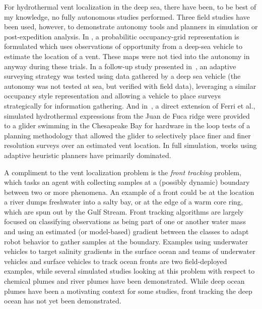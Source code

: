 For hydrothermal vent localization in the deep sea, there have been, to be best of my knowledge, no fully autonomous studies performed. Three field studies have been used, however, to demonstrate autonomy tools and planners in simulation or post-expedition analysis. In \cite{jakuba2007stochastic}, a probabilitic occupancy-grid representation is formulated which uses observations of opportunity from a deep-sea vehicle to estimate the location of a vent. These maps were not tied into the autonomy in anyway during these trials. In a follow-up study presented in~\cite{ferri2010novel}, an adaptive surveying strategy was tested using data gathered by a deep sea vehicle (the autonomy was not tested at sea, but verified with field data), leveraging a similar occupancy style representation and allowing a vehicle to place surveys strategically for information gathering. And in~\cite{branch2020demonstration}, a direct extension of Ferri et al., simulated hydrothermal expressions from the Juan de Fuca ridge were provided to a glider swimming in the Chesapeake Bay for hardware in the loop tests of a planning methodology that allowed the glider to selectively place finer and finer resolution surveys over an estimated vent location. In full simulation, works using adaptive heuristic planners\autocite{wang20203,pang2010plume} have primarily dominated.

A compliment to the vent localization problem is the \emph{front tracking} problem\autocite{chen2019odor}, which tasks an agent with collecting samples at a (possibly dynamic) boundary between two or more phenomena. An example of a front could be at the location a river dumps freshwater into a salty bay\autocite{mcclimans1988estuarine}, or at the edge of a warm core ring, which are spun out by the Gulf Stream\autocite{cushman1985oscillations}. Front tracking algorithms are largely focused on classifying observations as being part of one or another water mass and using an estimated (or model-based) gradient between the classes to adapt robot behavior to gather samples at the boundary. Examples using underwater vehicles to target salinity gradients in the surface ocean\autocite{belkin2018new} and teams of underwater vehicles and surface vehicles to track ocean fronts\autocite{mccammon2021ocean} are two field-deployed examples, while several simulated studies looking at this problem with respect to chemical plumes\autocite{wang2019dynamic,li2014multi} and river plumes\autocite{teixeira20213d} have been demonstrated. While deep ocean plumes have been a motivating context for some studies, front tracking the deep ocean has not yet been demonstrated.

